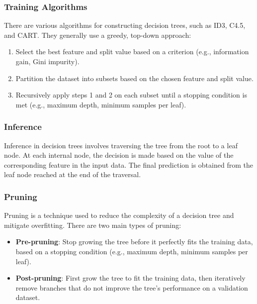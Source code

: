 \documentclass[12pt]{article}
\begin{document}
\subsubsection{Training Algorithms}

There are various algorithms for constructing decision trees, such as ID3, C4.5, and CART. They generally use a greedy, top-down approach:

\begin{enumerate}
\item Select the best feature and split value based on a criterion (e.g., information gain, Gini impurity).
\item Partition the dataset into subsets based on the chosen feature and split value.
\item Recursively apply steps 1 and 2 on each subset until a stopping condition is met (e.g., maximum depth, minimum samples per leaf).
\end{enumerate}

\subsubsection{Inference}

Inference in decision trees involves traversing the tree from the root to a leaf node. At each internal node, the decision is made based on the value of the corresponding feature in the input data. The final prediction is obtained from the leaf node reached at the end of the traversal.

\subsubsection{Pruning}

Pruning is a technique used to reduce the complexity of a decision tree and mitigate overfitting. There are two main types of pruning:

\begin{itemize}
\item \textbf{Pre-pruning}: Stop growing the tree before it perfectly fits the training data, based on a stopping condition (e.g., maximum depth, minimum samples per leaf).
\item \textbf{Post-pruning}: First grow the tree to fit the training data, then iteratively remove branches that do not improve the tree's performance on a validation dataset.
\end{itemize}
\end{document}
